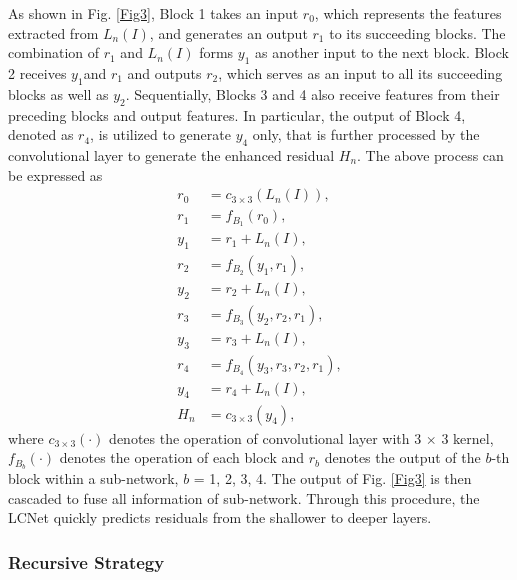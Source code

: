 \documentclass[journal]{IEEEtran}
\begin{document}
As shown in Fig. \ref{Fig3}, Block 1 takes an input \(r_{0}\), which represents the features extracted from \(L_{n}(I)\), and generates an output \(r_{1}\) to its succeeding blocks. The combination of \(r_{1}\) and \(L_{n}(I)\) forms \(y_{1}\) as another input to the next block. Block 2 receives \(y_{1}\)and \(r_{1}\) and outputs \(r_{2}\), which serves as an input to all its succeeding blocks as well as \(y_{2}\). Sequentially, Blocks 3 and 4 also receive features from their preceding blocks and output features. In particular, the output of Block 4, denoted as \(r_{4}\), is utilized to generate \(y_{4}\) only, that is further processed by the convolutional layer to generate the enhanced residual \(H_{n}\). The above process can be expressed as
\begin{equation}
 \begin{aligned}
r_{0}&=c_{3 \times 3}(L_{n}(I)),\\
r_{1}&=f_{B_1}(r_{0}),\\
y_{1}&=r_{1}+L_{n}(I),\\
r_{2}&=f_{B_2}(y_{1},r_{1}),\\
y_{2}&=r_{2}+L_{n}(I),\\
r_{3}&=f_{B_3}(y_{2},r_{2},r_{1}),\\
y_{3}&=r_{3}+L_{n}(I),\\
r_{4}&=f_{B_4}(y_{3},r_{3},r_{2},r_{1}),\\
y_{4}&=r_{4}+L_{n}(I),\\
H_{n}&=c_{3 \times 3}(y_{4}),
\end{aligned}   
\end{equation}
where \(c_{3 \times 3}(\cdot)\) denotes the operation of convolutional layer with 3 \(\times \) 3 kernel, \(f_{B_b}(\cdot)\) denotes the operation of each block and \(r_{b}\) denotes the output of the \(b\)-th block within a sub-network, \(b\) = 1, 2, 3, 4. The output of Fig. \ref{Fig3} is then cascaded to fuse all information of sub-network. Through this procedure, the LCNet quickly predicts residuals from the shallower to deeper layers.


\subsubsection{Recursive Strategy}
\end{document}
